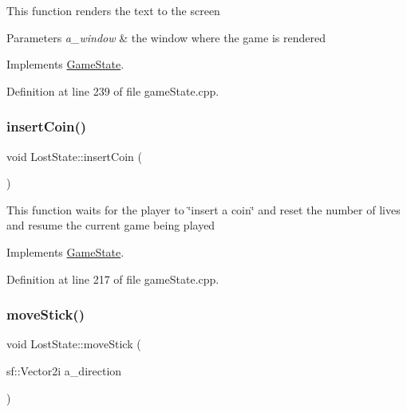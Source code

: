 This function renders the text to the screen


\begin{DoxyParams}{Parameters}
{\em a\+\_\+window} & the window where the game is rendered \\
\hline
\end{DoxyParams}


Implements \hyperlink{class_game_state_a5ffd5ce9acb7499ddef613e8836d1ef8}{Game\+State}.



Definition at line 239 of file game\+State.\+cpp.

\mbox{\label{class_lost_state_aa35179942033d9ab54fbcd7122f40497}} 
\subsubsection{\texorpdfstring{insert\+Coin()}{insertCoin()}}
{\footnotesize\ttfamily void Lost\+State\+::insert\+Coin (\begin{DoxyParamCaption}{ }\end{DoxyParamCaption})\hspace{0.3cm}{\ttfamily [virtual]}}

This function waits for the player to \char`\"{}insert a coin\char`\"{} and reset the number of lives and resume the current game being played 

Implements \hyperlink{class_game_state_a4cd6f5b4ad23fc08dca287df26d94b94}{Game\+State}.



Definition at line 217 of file game\+State.\+cpp.

\mbox{\label{class_lost_state_abc978a14604451eee5e0373b4ad374c8}} 
\subsubsection{\texorpdfstring{move\+Stick()}{moveStick()}}
{\footnotesize\ttfamily void Lost\+State\+::move\+Stick (\begin{DoxyParamCaption}\item[{sf\+::\+Vector2i}]{a\+\_\+direction }\end{DoxyParamCaption})\hspace{0.3cm}{\ttfamily [virtual]}}

